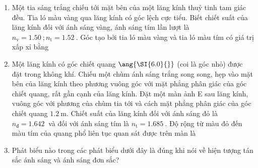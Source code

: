 \begin{enumerate}
{			
	}
	\item
	{
		Một tia sáng trắng chiếu tới mặt bên của một lăng kính thuỷ tinh tam giác đều. Tia ló màu vàng qua lăng kính có góc lệch cực tiểu. Biết chiết suất của lăng kính đối với ánh sáng vàng, ánh sáng tím lần lượt là $n_\text{v} = \SI{1.50}{}; n_\text{t}=\SI{1.52}{}$. Góc tạo bởi tia ló màu vàng và tia ló màu tím có giá trị xấp xỉ bằng
	}
	\item
	{
		Một lăng kính có góc chiết quang $\ang{\SI{6.0}{}}$ (coi là góc nhỏ) được đặt trong không khí. Chiếu một chùm ánh sáng trắng song song, hẹp vào mặt bên của lăng kính theo phương vuông góc với mặt phẳng phân giác của góc chiết quang, rất gần cạnh của lăng kính. Đặt một màn ảnh E sau lăng kính, vuông góc với phương của chùm tia tới và cách mặt phẳng phân giác của góc chiết quang $\SI{1.2}{\meter}$. Chiết suất của lăng kính đối với ánh sáng đỏ là $n_\text{đ}=\SI{1.642}{}$ và đối với ánh sáng tím là $n_\text{t}=\SI{1.685}{}$. Độ rộng từ màu đỏ đến màu tím của quang phổ liên tục quan sát được trên màn là
	}
	\item
	{
		Phát biểu nào trong các phát biểu dưới đây là đúng khi nói về hiện tượng tán sắc ánh sáng và ánh sáng đơn sắc?
		}
\end{enumerate}
